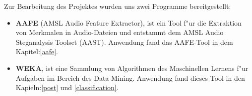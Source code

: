 Zur Bearbeitung des Projektes wurden uns zwei Programme bereitgestellt:
\begin{itemize}
	\item[\textbullet] \textbf{AAFE} (AMSL Audio Feature Extractor), ist ein Tool f"ur die Extraktion von Merkmalen in Audio-Dateien und entstammt dem AMSL Audio Steganalysis Toolset (AAST).\cite{kraetzer} Anwendung fand das AAFE-Tool in dem Kapitel:\ref{aafe}.
	\item[\textbullet] \textbf{WEKA}, ist eine Sammlung von Algorithmen des Maschinellen Lernens f"ur Aufgaben im Bereich des Data-Mining.\cite{weka} Anwendung fand dieses Tool in den Kapieln:\ref{post} und \ref{classification}.
\end{itemize}

